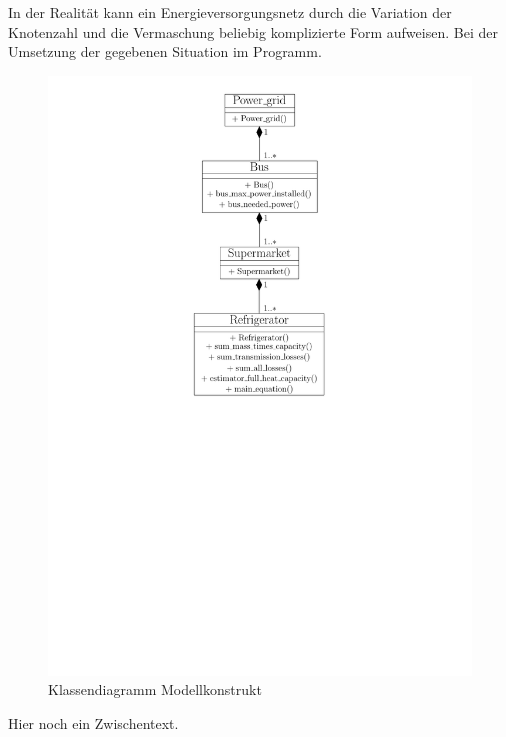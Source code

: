 In der Realität kann ein Energieversorgungsnetz durch die Variation der Knotenzahl und die Vermaschung beliebig komplizierte
Form aufweisen. Bei der Umsetzung der gegebenen Situation im Programm.

\begin{figure}[h]
\caption{Klassendiagramm Modellkonstrukt}
	\label{klassendiagramm}
	\begin{center}
	\includegraphics[scale=0.8]{images/Theorie_Super/class_diagramm}
	\end{center}
\end{figure}

Hier noch ein Zwischentext.

